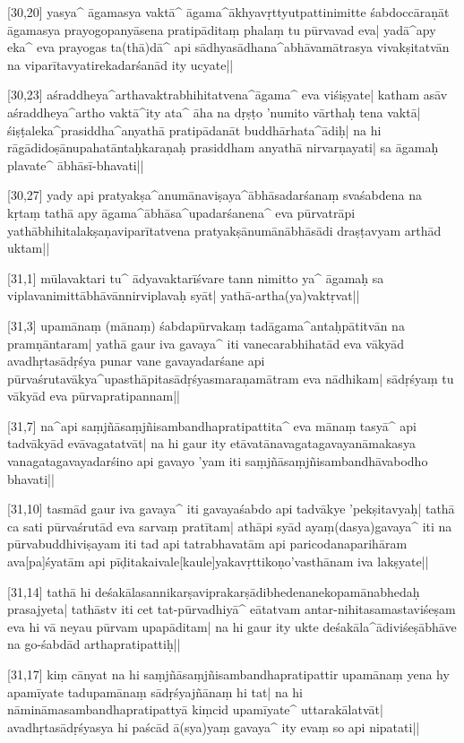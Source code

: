 [30,20] yasya^ āgamasya vaktā^ āgama^ākhyavṛttyutpattinimitte śabdoccāraṇāt āgamasya prayogopanyāsena pratipāditaṃ phalaṃ tu pūrvavad eva| yadā^apy eka^ eva prayogas ta(thā)dā^ api sādhyasādhana^abhāvamātrasya vivakṣitatvān na viparītavyatirekadarśanād ity ucyate||

[30,23] aśraddheya^arthavaktrabhihitatvena^āgama^ eva viśiṣyate| katham asāv aśraddheya^artho vaktā^ity ata^ āha na dṛṣṭo 'numito vārthaḥ tena vaktā| śiṣṭaleka^prasiddha^anyathā pratipādanāt buddhārhata^ādiḥ| na hi rāgādidoṣānupahatāntaḥkaraṇaḥ prasiddham anyathā nirvarṇayati| sa āgamaḥ plavate^ ābhāsī-bhavati||

[30,27] yady api pratyakṣa^anumānaviṣaya^ābhāsadarśanaṃ svaśabdena na kṛtaṃ tathā apy āgama^ābhāsa^upadarśanena^ eva pūrvatrāpi yathābhihitalakṣaṇaviparītatvena pratyakṣānumānābhāsādi draṣṭavyam arthād uktam||

[31,1] mūlavaktari tu^ ādyavaktarīśvare tann nimitto ya^ āgamaḥ sa viplavanimittābhāvānnirviplavaḥ syāt| yathā-artha(ya)vaktṛvat||

[31,3] upamānaṃ (mānaṃ) śabdapūrvakaṃ tadāgama^antaḥpātitvān na 
pramṇāntaram| yathā gaur iva gavaya^ iti vanecarabhihatād eva vākyād avadhṛtasādṛśya punar vane gavayadarśane api 
pūrvaśrutavākya^upasthāpitasādṛśyasmaraṇamātram eva nādhikam| sādṛśyaṃ tu vākyād eva pūrvapratipannam||

[31,7] na^api saṃjñāsaṃjñisambandhapratipattita^ eva mānaṃ tasyā^ api tadvākyād evāvagatatvāt| na hi gaur ity etāvatānavagatagavayanāmakasya vanagatagavayadarśino api gavayo 'yam iti saṃjñāsaṃjñisambandhāvabodho bhavati||

[31,10] tasmād gaur iva gavaya^ iti gavayaśabdo api tadvākye 'pekṣitavyaḥ| tathā ca sati pūrvaśrutād eva sarvaṃ pratītam| athāpi syād ayaṃ(dasya)gavaya^ iti na pūrvabuddhiviṣayam iti tad api tatrabhavatām api paricodanaparihāram ava[pa]śyatām api 
pīḍitakaivale[kaule]yakavṛttikoṇo'vasthānam iva lakṣyate||

[31,14] tathā hi deśakālasannikarṣaviprakarṣādibhedenanekopamānabhedaḥ prasajyeta| tathāstv iti cet tat-pūrvadhiyā^ eātatvam antar-nihitasamastaviśeṣam eva hi vā neyau pūrvam upapāditam| na hi gaur ity ukte deśakāla^ādiviśeṣābhāve na go-śabdād arthapratipattiḥ||

[31,17] kiṃ cānyat na hi saṃjñāsaṃjñisambandhapratipattir upamānaṃ yena hy apamīyate tadupamānaṃ sādṛśyajñānaṃ hi tat| na hi nāmināmasambandhapratipattyā kiṃcid upamīyate^ uttarakālatvāt| avadhṛtasādṛśyasya hi paścād ā(sya)yaṃ gavaya^ ity evaṃ so api nipatati||


